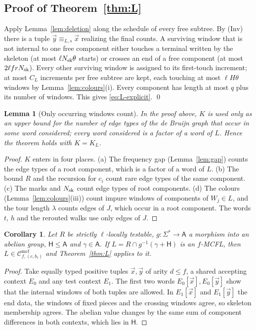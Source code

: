 \documentclass[11pt]{article}
\numberwithin{equation}{section}
\theoremstyle{plain}
\newtheorem{lemma}[theorem]{Lemma}
\newtheorem{corollary}[theorem]{Corollary}
\theoremstyle{definition}
\theoremstyle{remark}
\theoremstyle{plain}
\newcommand{\Cmcf}[2]{\mathcal{C}^{\mathrm{mcf}}_{#1,#2}}
\newcommand{\tuple}[1]{\vec{#1}}
\newcommand{\Kocc}{K_L}
\begin{document}
\subsection{Proof of Theorem~\ref{thm:L}}

Apply Lemma~\ref{lem:deletion} along the schedule of every free subtree.  By
(Inv) there is a tuple $\tuple y\equiv_{L,s}\tuple x$ realizing the final
counts.  A surviving window that is not internal to one free component either
touches a terminal written by the skeleton (at most $\ell N_{\rm sk}\theta$
starts) or crosses an end of a free component (at most $2\ell frN_{\rm sk}$).
Every other surviving window is assigned to its first-touch increment; at most
$C_L$ increments per free subtree are kept, each touching at most $\ell H\theta$
windows by Lemma~\ref{lem:colours}(i).  Every component has length at most $q$
plus its number of windows.  This gives \eqref{eq:L-explicit}.  \qed

\begin{lemma}[Only occurring windows count]
\label{lem:occurring}
In the proof above, $K$ is used only as an upper bound for the number of edge
types of the de Bruijn graph that occur in some word considered; every word
considered is a factor of a word of $L$.  Hence the theorem holds with
$K=\Kocc$.
\end{lemma}

\begin{proof}
$K$ enters in four places.  (a) The frequency gap (Lemma~\ref{lem:gap}) counts
the edge types of a root component, which is a factor of a word of $L$.
(b) The bound $R$ and the recursion for $c_i$ count rare edge types of the same
component.  (c) The marks and $N_{\rm sk}$ count edge types of root components.
(d) The colours (Lemma~\ref{lem:colours}(iii)) count impure windows of
components of $W_j\in L$, and the tour length $\lambda$ counts edges of $J$,
which occur in a root component.  The words $t$, $h$ and the rerouted walks use
only edges of $J$.
\end{proof}

\begin{corollary}
\label{cor:SL-coset}
Let $R$ be strictly $\ell$-locally testable, $g:\Sigma^*\to\mathsf A$ a morphism
into an abelian group, $\mathsf H\le\mathsf A$ and $\gamma\in\mathsf A$.  If
$L=R\cap g^{-1}(\gamma+\mathsf H)$ is an $f$-MCFL, then $L\in\Cmcf{f}{(c,b_\ell)}$
and Theorem~\ref{thm:L} applies to it.
\end{corollary}

\begin{proof}
Take equally typed positive tuples $\tuple x,\tuple y$ of arity $d\le f$, a
shared accepting context $E_0$ and any test context $E_1$.  The first two words
$E_0[\tuple x],E_0[\tuple y]$ show that the internal windows of both tuples are
allowed.  In $E_1[\tuple x]$ and $E_1[\tuple y]$ the end data, the windows of
fixed pieces and the crossing windows agree, so skeleton membership agrees.
The abelian value changes by the same sum of component differences in both
contexts, which lies in $\mathsf H$.
\end{proof}
\end{document}
